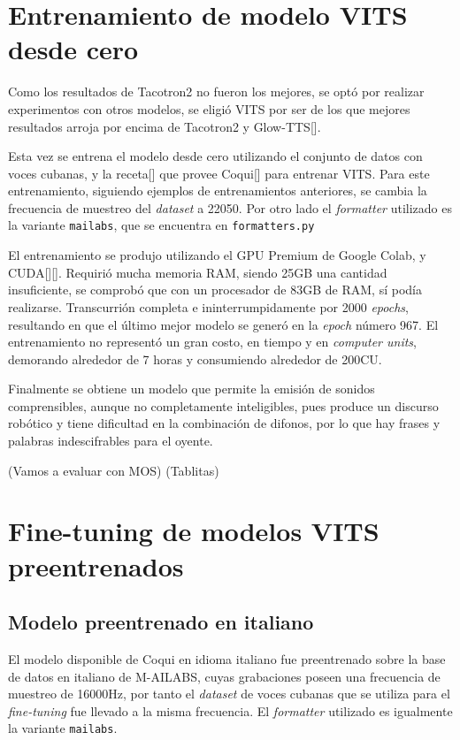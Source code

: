 \section{Entrenamiento de modelo VITS desde cero}
Como los resultados de Tacotron2 no fueron los mejores, se optó por realizar experimentos con otros modelos, se eligió VITS por ser de los que mejores resultados arroja por encima de Tacotron2 y Glow-TTS[\cite{kim2021conditional}].

Esta vez se entrena el modelo desde cero utilizando el conjunto de datos con voces cubanas, y la receta[\cite{train-vits}] que provee Coqui[\cite{coqui-doc}] para entrenar VITS. Para este entrenamiento, siguiendo ejemplos de entrenamientos anteriores, se cambia la frecuencia de muestreo del \textit{dataset} a 22050. Por otro lado el \textit{formatter} utilizado es la variante \texttt{mailabs}, que se encuentra en \texttt{formatters.py}

El entrenamiento se produjo utilizando el GPU Premium de Google Colab, y CUDA[\cite{cuda}][\cite{cuda1}]. Requirió mucha memoria RAM, siendo 25GB una cantidad insuficiente, se comprobó que con un procesador de 83GB de RAM, sí podía realizarse. Transcurrión completa e ininterrumpidamente por 2000 \textit{epochs}, resultando en que el último mejor modelo se generó en la \textit{epoch} número 967. El entrenamiento no representó un gran costo, en tiempo y en \textit{computer units}, demorando alrededor de 7 horas y consumiendo alrededor de 200CU.

Finalmente se obtiene un modelo que permite la emisión de sonidos comprensibles, aunque no completamente inteligibles, pues produce un discurso robótico y tiene dificultad en la combinación de difonos, por lo que hay frases y palabras indescifrables para el oyente.

(Vamos a evaluar con MOS)
(Tablitas)


\section{Fine-tuning de modelos VITS preentrenados}

\subsection{Modelo preentrenado en italiano}
El modelo disponible de Coqui en idioma italiano fue preentrenado sobre la base de datos en italiano de M-AILABS, cuyas grabaciones poseen una frecuencia de muestreo de 16000Hz, por tanto el \textit{dataset} de voces cubanas que se utiliza para el \textit{fine-tuning} fue llevado a la misma frecuencia.
El \textit{formatter} utilizado es igualmente la variante \texttt{mailabs}.

